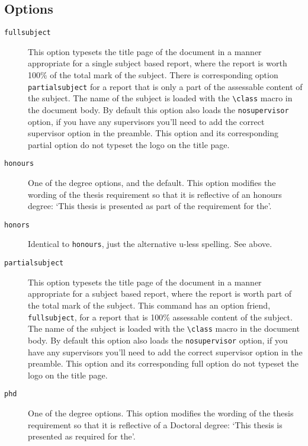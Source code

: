 \documentclass[12pt,oneside]{article}
\newcommand{\oporcom}[1]{\texttt{\color{RoyalBlue}#1}} %
\begin{document}
\subsection*{Options}
\begin{description}
    \item[\oporcom{fullsubject}]
    This option typesets the title page of the document in a manner appropriate for a single subject based report, where the report is worth 100\% of the total mark of the subject. There is corresponding option \oporcom{partialsubject} for a report that is only a part of the assessable content of the subject. The name of the subject is loaded with the \oporcom{\textbackslash{}class} macro in the document body. By default this option also loads the \oporcom{nosupervisor} option, if you have any supervisors you'll need to add the correct supervisor option in the preamble. This option and its corresponding partial option do not typeset the logo on the title page.
    
    \item[\oporcom{honours}]
    One of the degree options, and the default. This option modifies the wording of the thesis requirement so that it is reflective of an honours degree: `This thesis is presented as part of the requirement for the'.
    
    \item[\oporcom{honors}]
    Identical to \oporcom{honours}, just the alternative u-less spelling. See above.
    
    \item[\oporcom{partialsubject}]
    This option typesets the title page of the document in a manner appropriate for a subject based report, where the report is worth part of the total mark of the subject. This  command has an option friend, \oporcom{fullsubject}, for a report that is 100\% assessable content of the subject. The name of the subject is loaded with the \oporcom{\textbackslash{}class} macro in the document body. By default this option also loads the \oporcom{nosupervisor} option, if you have any supervisors you'll need to add the correct supervisor option in the preamble. This option and its corresponding full option do not typeset the logo on the title page.
    
    \item[\oporcom{phd}]
    One of the degree options. This option modifies the wording of the thesis requirement so that it is reflective of a Doctoral degree: `This thesis is presented as required for the'.
    

\end{description}
\end{document}

